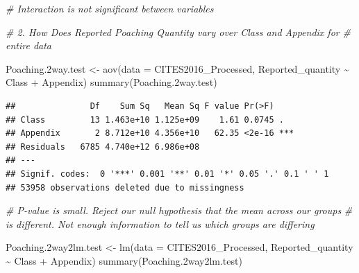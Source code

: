\documentclass[
  12pt,
]{article}
\newenvironment{Shaded}{\begin{snugshade}}{\end{snugshade}}
\newcommand{\AttributeTok}[1]{\textcolor[rgb]{0.77,0.63,0.00}{#1}}
\newcommand{\CommentTok}[1]{\textcolor[rgb]{0.56,0.35,0.01}{\textit{#1}}}
\newcommand{\FloatTok}[1]{\textcolor[rgb]{0.00,0.00,0.81}{#1}}
\newcommand{\FunctionTok}[1]{\textcolor[rgb]{0.00,0.00,0.00}{#1}}
\newcommand{\NormalTok}[1]{#1}
\newcommand{\OtherTok}[1]{\textcolor[rgb]{0.56,0.35,0.01}{#1}}
\newcommand{\SpecialCharTok}[1]{\textcolor[rgb]{0.00,0.00,0.00}{#1}}
\begin{document}
\begin{Shaded}
\begin{Highlighting}[]
\CommentTok{\# Interaction is not significant between variables}




\CommentTok{\# 2. How Does Reported Poaching Quantity vary over Class and Appendix for}
\CommentTok{\# entire data}

\NormalTok{Poaching}\FloatTok{.2}\NormalTok{way.test }\OtherTok{\textless{}{-}} \FunctionTok{aov}\NormalTok{(}\AttributeTok{data =}\NormalTok{ CITES2016\_Processed, Reported\_quantity }\SpecialCharTok{\textasciitilde{}}\NormalTok{ Class }\SpecialCharTok{+}
\NormalTok{    Appendix)}
\FunctionTok{summary}\NormalTok{(Poaching}\FloatTok{.2}\NormalTok{way.test)}
\end{Highlighting}
\end{Shaded}

\begin{verbatim}
##               Df    Sum Sq   Mean Sq F value Pr(>F)    
## Class         13 1.463e+10 1.125e+09    1.61 0.0745 .  
## Appendix       2 8.712e+10 4.356e+10   62.35 <2e-16 ***
## Residuals   6785 4.740e+12 6.986e+08                   
## ---
## Signif. codes:  0 '***' 0.001 '**' 0.01 '*' 0.05 '.' 0.1 ' ' 1
## 53958 observations deleted due to missingness
\end{verbatim}

\begin{Shaded}
\begin{Highlighting}[]
\CommentTok{\# P{-}value is small. Reject our null hypothesis that the mean across our groups}
\CommentTok{\# is different.  Not enough information to tell us which groups are differing}

\NormalTok{Poaching}\FloatTok{.2}\NormalTok{way2lm.test }\OtherTok{\textless{}{-}} \FunctionTok{lm}\NormalTok{(}\AttributeTok{data =}\NormalTok{ CITES2016\_Processed, Reported\_quantity }\SpecialCharTok{\textasciitilde{}}\NormalTok{ Class }\SpecialCharTok{+}
\NormalTok{    Appendix)}
\FunctionTok{summary}\NormalTok{(Poaching}\FloatTok{.2}\NormalTok{way2lm.test)}
\end{Highlighting}
\end{Shaded}
\end{document}
